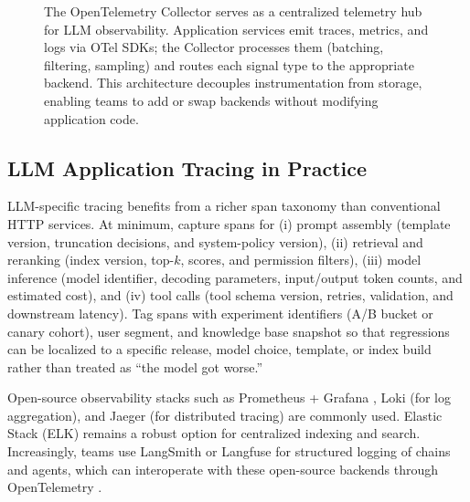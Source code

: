\begin{figure}[t]
\begin{llmfigbox}
\end{llmfigbox}
\caption{The OpenTelemetry Collector serves as a centralized telemetry hub for LLM observability. Application services emit traces, metrics, and logs via OTel SDKs; the Collector processes them (batching, filtering, sampling) and routes each signal type to the appropriate backend. This architecture decouples instrumentation from storage, enabling teams to add or swap backends without modifying application code.}
\label{fig:ch05_otel_collector_hub}
\end{figure}

\subsection{LLM Application Tracing in Practice}\label{sec:llm-tracing-practice}
LLM-specific tracing benefits from a richer span taxonomy than conventional HTTP services. At minimum, capture spans for (i) prompt assembly (template version, truncation decisions, and system-policy version), (ii) retrieval and reranking (index version, top-$k$, scores, and permission filters), (iii) model inference (model identifier, decoding parameters, input/output token counts, and estimated cost), and (iv) tool calls (tool schema version, retries, validation, and downstream latency). Tag spans with experiment identifiers (A/B bucket or canary cohort), user segment, and knowledge base snapshot so that regressions can be localized to a specific release, model choice, template, or index build rather than treated as ``the model got worse.''

Open-source observability stacks such as Prometheus \cite{prometheus_instrumentation} + Grafana \cite{grafana_dashboards}, Loki (for log aggregation), and Jaeger \cite{jaeger_tracing} (for distributed tracing) are commonly used. Elastic Stack (ELK) remains a robust option for centralized indexing and search. Increasingly, teams use LangSmith or Langfuse for structured logging of chains and agents, which can interoperate with these open-source backends through OpenTelemetry \cite{otel_spec}.

